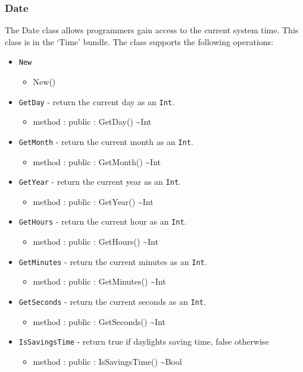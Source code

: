 \documentclass[12pt]{article}
\begin{document}
\subsubsection{Date}
The Date class allows programmers gain access to the current system
time.  This class is in the `Time' bundle.  The class supports the following operations:
\begin{itemize}
\item \texttt{New}
  \begin{itemize}
  \item New()
  \end{itemize}
\item \texttt{GetDay} - return the current day as an \texttt{Int}.
  \begin{itemize}
  \item method : public : GetDay() \textasciitilde Int
  \end{itemize}
\item \texttt{GetMonth} - return the current month as an \texttt{Int}.
  \begin{itemize}
  \item method : public : GetMonth() \textasciitilde Int
  \end{itemize}
\item \texttt{GetYear} - return the current year as an \texttt{Int}.
  \begin{itemize}
  \item method : public : GetYear() \textasciitilde Int
  \end{itemize}
\item \texttt{GetHours} - return the current hour as an \texttt{Int}.
  \begin{itemize}
  \item method : public : GetHours() \textasciitilde Int
  \end{itemize}
\item \texttt{GetMinutes} - return the current minutes as an
  \texttt{Int}.
  \begin{itemize}
  \item method : public : GetMinutes() \textasciitilde Int
  \end{itemize}
\item \texttt{GetSeconds} - return the current seconds as an
  \texttt{Int}.
  \begin{itemize}
  \item method : public : GetSeconds() \textasciitilde Int
  \end{itemize}
\item \texttt{IsSavingsTime} - return true if daylights saving time,
  false otherwise
  \begin{itemize}
  \item method : public : IsSavingsTime() \textasciitilde Bool
  \end{itemize}
\end{itemize}
\end{document}
